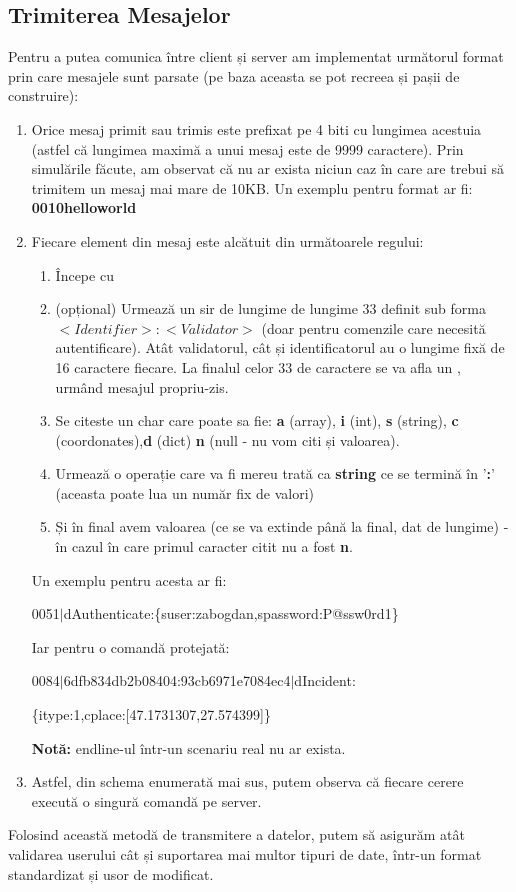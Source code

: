 \documentclass{article}
\begin{document}
\subsection{Trimiterea Mesajelor}
Pentru a putea comunica între client și server am implementat următorul format prin care mesajele sunt parsate (pe baza aceasta se pot recreea și pașii de construire):
\begin{enumerate}
    \item Orice mesaj primit sau trimis este prefixat pe 4 biti cu lungimea acestuia (astfel că lungimea maximă a unui mesaj este de 9999 caractere). Prin simulările făcute, am observat că nu ar exista niciun caz în care are trebui să trimitem un mesaj mai mare de 10KB. Un exemplu pentru format ar fi: \textbf{0010helloworld}
    \item Fiecare element din mesaj este alcătuit din următoarele regului: 
    \begin{enumerate}
        \item Începe cu \textbar 
        \item (opțional) Urmează un sir de lungime de lungime 33 definit sub forma \(<Identifier>:<Validator>\) (doar pentru comenzile care necesită autentificare). Atât validatorul, cât și identificatorul au o lungime fixă de 16 caractere fiecare. La finalul celor 33 de caractere se va afla un \textbar, urmând mesajul propriu-zis.
        \item Se citeste un char care poate sa fie: \textbf{a} (array), \textbf{i} (int), \textbf{s} (string), \textbf{c} (coordonates),\textbf{d} (dict) \textbf{n} (null - nu vom citi și valoarea).
        \item Urmează o operație care va fi mereu trată ca \textbf{string} ce se termină în '\textbf{:}' (aceasta poate lua un număr fix de valori)
        \item Și în final avem valoarea (ce se va extinde până la final, dat de lungime) - în cazul în care primul caracter citit nu a fost \textbf{n}.
    \end{enumerate}
    Un exemplu pentru acesta ar fi: 
    
    0051\(\vert\)dAuthenticate:\{suser:zabogdan,spassword:P@ssw0rd1\}

    Iar pentru o comandă protejată:

    0084\(\vert\)6dfb834db2b08404:93cb6971e7084ec4\(\vert\)dIncident:

    \{itype:1,cplace:[47.1731307,27.574399]\}

    \textbf{Notă:} endline-ul într-un scenariu real nu ar exista.

    \item Astfel, din schema enumerată mai sus, putem observa că fiecare cerere execută o singură comandă pe server.
\end{enumerate}
Folosind această metodă de transmitere a datelor, putem să asigurăm atât validarea userului cât și suportarea mai multor tipuri de date, într-un format standardizat și usor de modificat.
\end{document}

